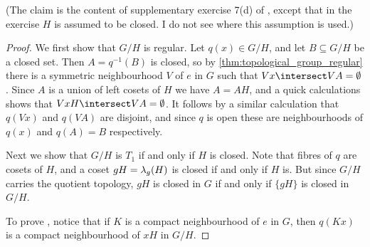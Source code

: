 \documentclass[article, a4paper, 11pt, oneside]{memoir}
\numberwithin{equation}{chapter}
\newcommand{\preim}{^{-1}}
\begin{document}
(The claim  is the content of supplementary exercise 7(d) of \textcite[Chapter~2]{munkres}, except that in the exercise $H$ is assumed to be closed. I do not see where this assumption is used.)

\begin{proof}
    We first show that $G/H$ is regular. Let $q(x) \in G/H$, and let $B \subseteq G/H$ be a closed set. Then $A = q\preim(B)$ is closed, so by \cref{thm:topological_group_regular} there is a symmetric neighbourhood $V$ of $e$ in $G$ such that $Vx \intersect VA = \emptyset$. Since $A$ is a union of left cosets of $H$ we have $A = AH$, and a quick calculations shows that $VxH \intersect VA = \emptyset$. It follows by a similar calculation that $q(Vx)$ and $q(VA)$ are disjoint, and since $q$ is open these are neighbourhoods of $q(x)$ and $q(A) = B$ respectively.

    Next we show that $G/H$ is $T_1$ if and only if $H$ is closed. Note that fibres of $q$ are cosets of $H$, and a coset $gH = \lambda_g(H)$ is closed if and only if $H$ is. But since $G/H$ carries the quotient topology, $gH$ is closed in $G$ if and only if $\{gH\}$ is closed in $G/H$.


    To prove , notice that if $K$ is a compact neighbourhood of $e$ in $G$, then $q(Kx)$ is a compact neighbourhood of $xH$ in $G/H$.
\end{proof}

\end{document}
